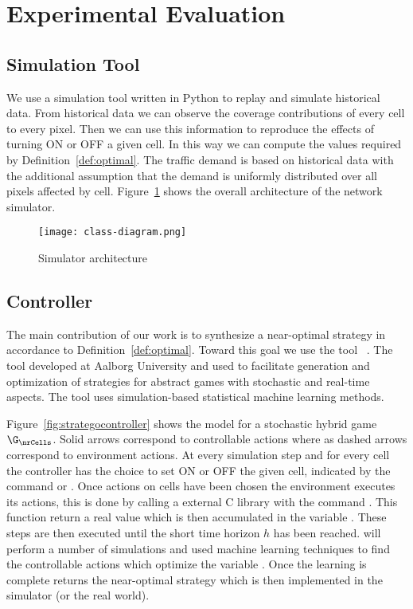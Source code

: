 \section{Experimental Evaluation}

\subsection{Simulation Tool}
We use a simulation tool written in Python to replay and simulate
historical data. From historical data we can observe the coverage
contributions of every cell to every pixel. Then we can use this
information to reproduce the effects of turning \textsf{ON} or
\textsf{OFF} a given cell. In this way we can compute the values
required by Definition~\ref{def:optimal}. The traffic demand is based
on historical data with the additional assumption that the demand is
uniformly distributed over all pixels affected by
cell. Figure~\ref{fig:simulatorclasses} shows the overall architecture
of the network simulator.

\begin{figure}[t]
  \centering
  \texttt{[image: class-diagram.png]}
  \caption{Simulator architecture}
  \label{fig:simulatorclasses}
\end{figure}


\subsection{\stratego Controller}
\label{def:strategocontroller}

The main contribution of our work is to synthesize a near-optimal
strategy in accordance to Definition~\ref{def:optimal}. Toward this
goal we use the tool \stratego{}~\cite{uppaal}. The tool developed at
Aalborg University and used to facilitate generation and optimization
of strategies for abstract games with stochastic and real-time
aspects. The tool uses simulation-based statistical machine learning
methods.


Figure~\ref{fig:strategocontroller} shows the \stratego model for a
stochastic hybrid game $\G_{\nrCells}$. Solid arrows correspond to
controllable actions where as dashed arrows correspond to environment
actions. At every simulation step and for every cell the controller
has the choice to set \textsf{ON} or \textsf{OFF} the given cell,
indicated by the command  or
. Once actions on cells have been chosen
the environment executes its actions, this is done by calling a
external C library with the command
.  This function return a real
value which is then accumulated in the variable . These
steps are then executed until the short time horizon $h$ has been
reached. \stratego will perform a number of simulations and used
machine learning techniques to find the controllable actions which
optimize the variable . Once the learning is complete
\stratego returns the near-optimal strategy which is then implemented
in the simulator (or the real world).


